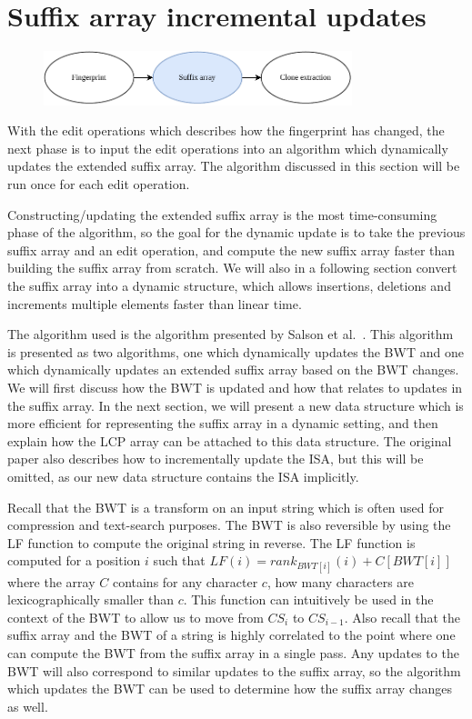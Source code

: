 \section{Suffix array incremental updates}

\begin{figure}[H]
    \begin{center}
        \includegraphics[width=0.8\textwidth]{figures/phases/phases_suffix.drawio.pdf}
    \end{center}
\end{figure}

With the edit operations which describes how the fingerprint has changed, the next phase
is to input the edit operations into an algorithm which dynamically updates the extended
suffix array. The algorithm discussed in this section will be run once for each edit
operation.

Constructing/updating the extended suffix array is the most time-consuming phase of the
algorithm, so the goal for the dynamic update is to take the previous suffix array and an
edit operation, and compute the new suffix array faster than building the suffix array
from scratch. We will also in a following section convert the suffix array into a dynamic
structure, which allows insertions, deletions and increments multiple elements faster than
linear time.

The algorithm used is the algorithm presented by Salson et al.~\cite{DynamicBWT,
DynamicExtendedSuffixArrays}. This algorithm is presented as two algorithms, one which
dynamically updates the BWT and one which dynamically updates an extended suffix array
based on the BWT changes. We will first discuss how the BWT is updated and how that
relates to updates in the suffix array. In the next section, we will present a new data
structure which is more efficient for representing the suffix array in a dynamic setting,
and then explain how the LCP array can be attached to this data structure. The original
paper also describes how to incrementally update the ISA, but this will be omitted, as our
new data structure contains the ISA implicitly.

Recall that the BWT is a transform on an input string which is often used for compression
and text-search purposes. The BWT is also reversible by using the LF function to compute
the original string in reverse. The LF function is computed for a position $i$ such that
$LF(i) = rank_{BWT[i]}(i) + C[BWT[i]]$ where the array $C$ contains for any character $c$,
how many characters are lexicographically smaller than $c$. This function can intuitively
be used in the context of the BWT to allow us to move from $CS_i$ to $CS_{i-1}$. Also
recall that the suffix array and the BWT of a string is highly correlated to the point
where one can compute the BWT from the suffix array in a single pass. Any updates to the
BWT will also correspond to similar updates to the suffix array, so the algorithm which
updates the BWT can be used to determine how the suffix array changes as well.

